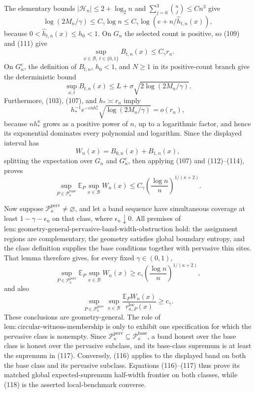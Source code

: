 The elementary bounds \(|\mathcal H_n|\le 2+\log_2 n\) and \(\sum_{j=0}^3\binom nj\le Cn^3\) give
\[
 \log(2M_n/\gamma)\le C_\gamma\log n
 \le C_\gamma\log(e+n/\widehat h_{t,n}(x)), \tag{111}
\]
because \(0<\widehat h_{t,n}(x)\le h_0<1\). On \(G_n\) the selected count is positive, so (109) and (111) give
\[
 \sup_{x\in\mathcal B,\ t\in\{0,1\}}B_{t,n}(x)\le C_\gamma r_n. \tag{112}
\]
On \(G_n^c\), the definition of \(B_{t,n}\), \(h_0<1\), and \(N\ge1\) in its positive-count branch give the deterministic bound
\[
 \sup_{x,t}B_{t,n}(x)\le L+\sigma\sqrt{2\log(2M_n/\gamma)}. \tag{113}
\]
Furthermore, (103), (107), and \(h_*\asymp r_n\) imply
\[
 h_*^{-1}e^{-cnh_*^\kappa}\sqrt{\log(2M_n/\gamma)}=o(r_n), \tag{114}
\]
because \(nh_*^\kappa\) grows as a positive power of \(n\), up to a logarithmic factor, and hence its exponential dominates every polynomial and logarithm. Since the displayed interval has
\[
 W_n(x)=B_{0,n}(x)+B_{1,n}(x), \tag{115}
\]
splitting the expectation over \(G_n\) and \(G_n^c\), then applying (107) and (112)--(114), proves
\[
 \sup_{P\in\mathcal P_\kappa^{\mathrm{base}}}
 \mathbb E_P\sup_{x\in\mathcal B}W_n(x)\le
 C_\gamma\left(\frac{\log n}{n}\right)^{1/(\kappa+2)}. \tag{116}
\]

Now suppose \(\mathcal P_\kappa^{\mathrm{perv}}\ne\varnothing\), and let a band sequence have simultaneous coverage at least \(1-\gamma-\epsilon_n\) on that class, where \(\epsilon_n\downarrow0\). All premises of \(\mathrm{lem:geometry\text{-}general\text{-}pervasive\text{-}band\text{-}width\text{-}obstruction}\) hold: the assignment regions are complementary, the geometry satisfies global boundary entropy, and the class definition supplies the base conditions together with pervasive thin sites. That lemma therefore gives, for every fixed \(\gamma\in(0,1)\),
\[
 \sup_{P\in\mathcal P_\kappa^{\mathrm{perv}}}
 \mathbb E_P\sup_{x\in\mathcal B}W_n(x)\ge
 c_\gamma\left(\frac{\log n}{n}\right)^{1/(\kappa+2)}, \tag{117}
\]
and also
\[
 \sup_{P\in\mathcal P_\kappa^{\mathrm{perv}}}\sup_{x\in\mathcal B}
 \frac{\mathbb E_PW_n(x)}{r_{n,P}^{\mathrm{loc}}(x)}\ge c_\gamma. \tag{118}
\]
These conclusions are geometry-general. The role of \(\mathrm{lem:circular\text{-}witness\text{-}membership}\) is only to exhibit one specification for which the pervasive class is nonempty. Since \(\mathcal P_\kappa^{\mathrm{perv}}\subseteq\mathcal P_\kappa^{\mathrm{base}}\), a band honest over the base class is honest over the pervasive subclass, and its base-class supremum is at least the supremum in (117). Conversely, (116) applies to the displayed band on both the base class and its pervasive subclass. Equations (116)--(117) thus prove its matched global expected-supremum half-width frontier on both classes, while (118) is the asserted local-benchmark converse.


